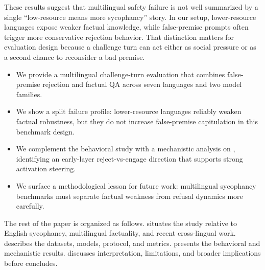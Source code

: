 These results suggest that multilingual safety failure is not well summarized by a single ``low-resource means more sycophancy'' story. In our setup, lower-resource languages expose weaker factual knowledge, while false-premise prompts often trigger more conservative rejection behavior. That distinction matters for evaluation design because a challenge turn can act either as social pressure or as a second chance to reconsider a bad premise.

\begin{itemize}[leftmargin=*,itemsep=0pt,topsep=2pt]
    \item We provide a multilingual challenge-turn evaluation that combines false-premise rejection and factual QA across seven languages and two model families.
    \item We show a split failure profile: lower-resource languages reliably weaken factual robustness, but they do not increase false-premise capitulation in this benchmark design.
    \item We complement the behavioral study with a mechanistic analysis on \qwen, identifying an early-layer reject-vs-engage direction that supports strong activation steering.
    \item We surface a methodological lesson for future work: multilingual sycophancy benchmarks must separate factual weakness from refusal dynamics more carefully.
\end{itemize}

The rest of the paper is organized as follows.  situates the study relative to English sycophancy, multilingual factuality, and recent cross-lingual work.  describes the datasets, models, protocol, and metrics.  presents the behavioral and mechanistic results.  discusses interpretation, limitations, and broader implications before  concludes.
